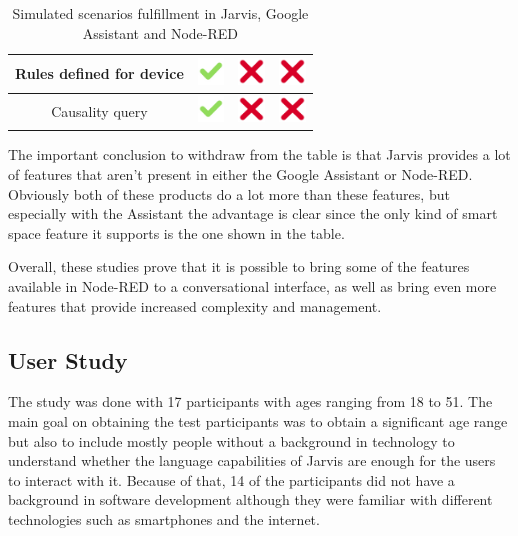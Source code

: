 \documentclass[runningheads]{llncs}
\begin{document}
\begin{table}
\begin{tabular}{ | c | c | c | c |}
    Rules defined for device &
    \includegraphics[width=20pt]{figures/checkmark} & 
    \includegraphics[width=20pt]{figures/cross} &
    \includegraphics[width=20pt]{figures/cross} \\ \hline
    
    Causality query &
    \includegraphics[width=20pt]{figures/checkmark} & 
    \includegraphics[width=20pt]{figures/cross} &
    \includegraphics[width=20pt]{figures/cross} \\ \hline
    \end{tabular}

    \caption{Simulated scenarios fulfillment in Jarvis, Google Assistant and Node-RED}
    \label{table:comparison}
\end{table}

The important conclusion to withdraw from the table is that Jarvis provides a lot of features that aren't present in either the Google Assistant or Node-RED. Obviously both of these products do a lot more than these features, but especially with the Assistant the advantage is clear since the only kind of smart space feature it supports is the one shown in the table.

Overall, these studies prove that it is possible to bring some of the features available in Node-RED to a conversational interface, as well as bring even more features that provide increased complexity and management.

\subsection{User Study}

The study was done with 17 participants with ages ranging from 18 to 51. The main goal on obtaining the test participants was to obtain a significant age range but also to include mostly people without a background in technology to understand whether the language capabilities of Jarvis are enough for the users to interact with it. Because of that, 14 of the participants did not have a background in software development although they were familiar with different technologies such as smartphones and the internet.
\end{document}
